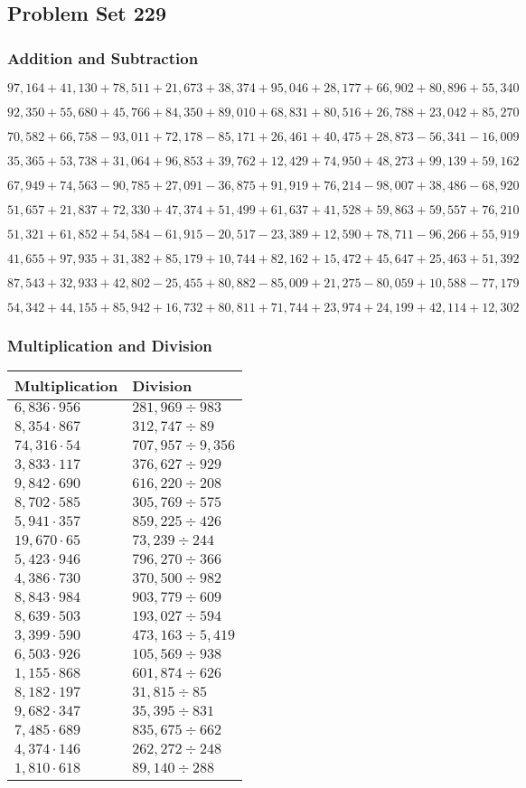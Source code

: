 \hypertarget{problem-set-229}{%
\subsection{Problem Set 229}\label{problem-set-229}}

\hypertarget{addition-and-subtraction}{%
\subsubsection{Addition and
Subtraction}\label{addition-and-subtraction}}

\(97,164+41,130+78,511+21,673+38,374+95,046+28,177+66,902+80,896+55,340\)

\(92,350+55,680+45,766+84,350+89,010+68,831+80,516+26,788+23,042+85,270\)

\(70,582+66,758-93,011+72,178-85,171+26,461+40,475+28,873-56,341-16,009\)

\(35,365+53,738+31,064+96,853+39,762+12,429+74,950+48,273+99,139+59,162\)

\(67,949+74,563-90,785+27,091-36,875+91,919+76,214-98,007+38,486-68,920\)

\(51,657+21,837+72,330+47,374+51,499+61,637+41,528+59,863+59,557+76,210\)

\(51,321+61,852+54,584-61,915-20,517-23,389+12,590+78,711-96,266+55,919\)

\(41,655+97,935+31,382+85,179+10,744+82,162+15,472+45,647+25,463+51,392\)

\(87,543+32,933+42,802-25,455+80,882-85,009+21,275-80,059+10,588-77,179\)

\(54,342+44,155+85,942+16,732+80,811+71,744+23,974+24,199+42,114+12,302\)

\hypertarget{multiplication-and-division}{%
\subsubsection{Multiplication and
Division}\label{multiplication-and-division}}

\begin{longtable}[]{@{}ll@{}}
\toprule
Multiplication & Division\tabularnewline
\midrule
\endhead
\(6,836\cdot956\) & \(281,969÷983\)\tabularnewline
\(8,354\cdot867\) & \(312,747 ÷89\)\tabularnewline
\(74,316\cdot54\) & \(707,957÷9,356\)\tabularnewline
\(3,833\cdot117\) & \(376,627÷929\)\tabularnewline
\(9,842\cdot690\) & \(616,220÷208\)\tabularnewline
\(8,702\cdot585\) & \(305,769÷575\)\tabularnewline
\(5,941\cdot357\) & \(859,225÷426\)\tabularnewline
\(19,670\cdot65\) & \(73,239÷244\)\tabularnewline
\(5,423\cdot946\) & \(796,270÷366\)\tabularnewline
\(4,386\cdot730\) & \(370,500÷982\)\tabularnewline
\(8,843\cdot984\) & \(903,779÷609\)\tabularnewline
\(8,639\cdot503\) & \(193,027÷594\)\tabularnewline
\(3,399\cdot590\) & \(473,163÷5,419\)\tabularnewline
\(6,503\cdot926\) & \(105,569÷938\)\tabularnewline
\(1,155\cdot868\) & \(601,874÷626\)\tabularnewline
\(8,182\cdot197\) & \(31,815÷85\)\tabularnewline
\(9,682\cdot347\) & \(35,395÷831\)\tabularnewline
\(7,485\cdot689\) & \(835,675÷662\)\tabularnewline
\(4,374\cdot146\) & \(262,272÷248\)\tabularnewline
\(1,810\cdot618\) & \(89,140÷288\)\tabularnewline
\bottomrule
\end{longtable}
